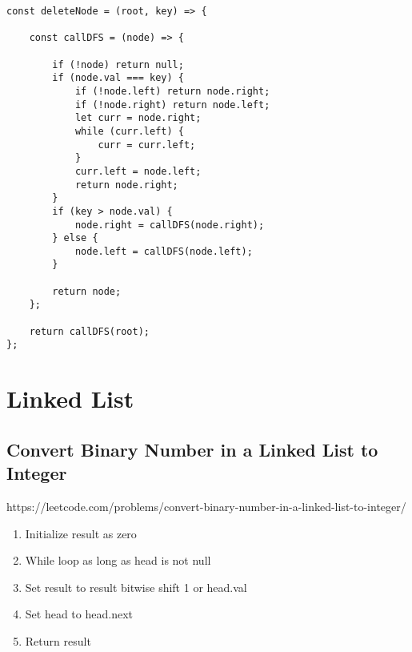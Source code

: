 \documentclass[10pt]{article}
\begin{document}
\begin{lstlisting}[title=Solution deleteNode, captionpos=t]
const deleteNode = (root, key) => {
    
    const callDFS = (node) => {
    
        if (!node) return null;
        if (node.val === key) {
            if (!node.left) return node.right;
            if (!node.right) return node.left;
            let curr = node.right;
            while (curr.left) {
                curr = curr.left;
            }
            curr.left = node.left;
            return node.right;
        }
        if (key > node.val) {
            node.right = callDFS(node.right);
        } else {
            node.left = callDFS(node.left);
        }
        
        return node;
    };
    
    return callDFS(root);
};
\end{lstlisting}
\medskip %

















\pagebreak
\section{Linked List}






\medskip   
\subsection {Convert Binary Number in a Linked List to Integer}
https://leetcode.com/problems/convert-binary-number-in-a-linked-list-to-integer/

\begin{enumerate}
	\item Initialize result as zero 
	\item While loop as long as head is not null
	\item Set result to result bitwise shift 1 or head.val
	\item Set head to head.next
	\item Return result
\end{enumerate}
\end{document}
